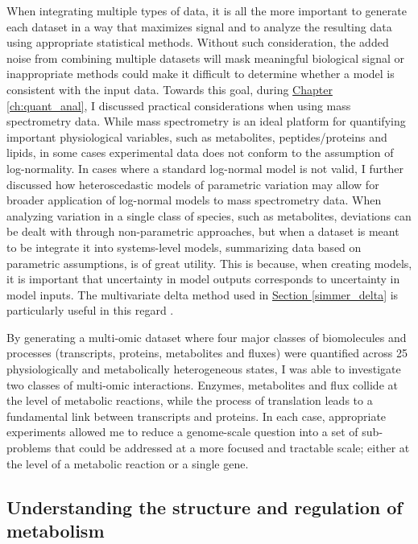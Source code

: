 When integrating multiple types of data, it is all the more important to generate each dataset in a way that maximizes signal and to analyze the resulting data using appropriate statistical methods. Without such consideration, the added noise from combining multiple datasets will mask meaningful biological signal or inappropriate methods could make it difficult to determine whether a model is consistent with the input data. Towards this goal, during \hyperref[ch:quant_anal]{Chapter \ref{ch:quant_anal}}, I discussed practical considerations when using mass spectrometry data.  While mass spectrometry is an ideal platform for quantifying important physiological variables, such as metabolites, peptides/proteins and lipids, in some cases experimental data does not conform to the assumption of log-normality. In cases where a standard log-normal model is not valid, I further discussed how heteroscedastic models of parametric variation may allow for broader application of log-normal models to mass spectrometry data. When analyzing variation in a single class of species, such as metabolites, deviations can be dealt with through non-parametric approaches, but when a dataset is meant to be integrate it into systems-level models, summarizing data based on parametric assumptions, is of great utility.  This is because, when creating models, it is important that uncertainty in model outputs corresponds to uncertainty in model inputs. The multivariate delta method used in \hyperref[simmer_delta]{Section \ref{simmer_delta}} is particularly useful in this regard \cite{Lynch:1998vx}.

By generating a multi-omic dataset where four major classes of biomolecules and processes (transcripts, proteins, metabolites and fluxes) were quantified across 25 physiologically and metabolically heterogeneous states, I was able to investigate two classes of multi-omic interactions. Enzymes, metabolites and flux collide at the level of metabolic reactions, while the process of translation leads to a fundamental link between transcripts and proteins. In each case, appropriate experiments allowed me to reduce a genome-scale question into a set of sub-problems that could be addressed at a more focused and tractable scale; either at the level of a metabolic reaction or a single gene.

\subsection{Understanding the structure and regulation of metabolism}

